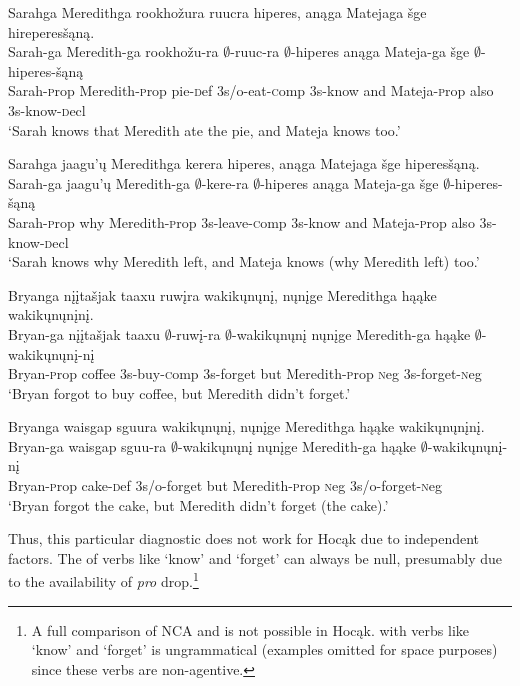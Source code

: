 \documentclass[output=paper]{LSP/langsci}
\begin{document}
\ea\label{ex:johnson:32}
\ea\label{ex:johnson:32a} 
\glll Sarahga Meredithga rookhožura ruucra hiperes, anąga Matejaga šge hireperesšąną.\\
Sarah-ga Meredith-ga rookhožu-ra $\emptyset$-ruuc-ra $\emptyset$-hiperes anąga Mateja-ga šge $\emptyset$-hiperes-šąną\\
Sarah-{\textsc prop} Meredith-{\textsc prop} pie-{\textsc def} {\textsc 3s/o}-eat-{\textsc comp} {\textsc 3s}-know and Mateja-{\textsc prop} also {\textsc 3s}-know-{\textsc decl}\\
\trans `Sarah knows that Meredith ate the pie, and Mateja knows too.'
 
\ex\label{ex:johnson:32b} 
\glll Sarahga jaagu'ų Meredithga kerera hiperes, anąga Matejaga šge hiperesšąną.\\
Sarah-ga jaagu'ų Meredith-ga $\emptyset$-kere-ra $\emptyset$-hiperes anąga Mateja-ga šge $\emptyset$-hiperes-šąną\\
Sarah-{\textsc prop} why Meredith-{\textsc prop} {\textsc 3s}-leave-{\textsc comp} {\textsc 3s}-know and Mateja-{\textsc prop} also {\textsc 3s}-know-{\textsc decl}\\
\trans `Sarah knows why Meredith left, and Mateja knows (why Meredith left) too.'
\z
\z

 
\ea\label{ex:johnson:33}
\ea\label{ex:johnson:33a} 
\glll Bryanga {nįįtašjak taaxu} ruwįra wakikųnųnį, nųnįge Meredithga hąąke wakikųnųnįnį.\\
Bryan-ga {nįįtašjak taaxu} $\emptyset$-ruwį-ra $\emptyset$-wakikųnųnį nųnįge Meredith-ga hąąke $\emptyset$-wakikųnųnį-nį\\
Bryan-{\textsc prop} coffee {\textsc 3s}-buy-{\textsc comp} {\textsc 3s}-forget but Meredith-{\textsc prop} {\textsc neg} {\textsc 3s}-forget-{\textsc neg}\\
\trans `Bryan forgot to buy coffee, but Meredith didn't forget.'
 
\ex\label{ex:johnson:33b} 
\glll Bryanga {waisgap sguura} wakikųnųnį, nųnįge Meredithga hąąke wakikųnųnįnį.\\
Bryan-ga {waisgap sguu-ra} $\emptyset$-wakikųnųnį nųnįge Meredith-ga hąąke $\emptyset$-wakikųnųnį-nį\\
Bryan-{\textsc prop} cake-{\textsc def} {\textsc 3s/o}-forget but Meredith-{\textsc prop} {\textsc neg} {\textsc 3s/o}-forget-{\textsc neg}\\
\trans `Bryan forgot the cake, but Meredith didn't forget (the cake).'
\z
\z


Thus, this particular diagnostic does not work for Hocąk due to independent factors. The  of verbs like `know' and `forget' can always be null, presumably due to the availability of  \emph{pro} drop.\footnote{A full comparison of NCA and  is not possible in Hocąk.  with verbs like `know' and `forget' is ungrammatical (examples omitted for space purposes) since these verbs are non-agentive.}
\end{document}
